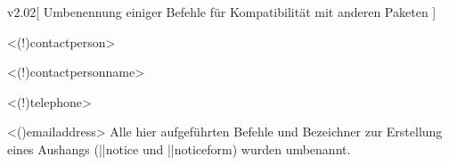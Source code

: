 \begin{Changes}{v2.02}[%
  Umbenennung einiger Befehle für Kompatibilität mit anderen Paketen%
]
\begin{Entity}{}
\begin{Obsolete}
  {}
  <\Macro(!){contactperson}>
\begin{Obsolete}
  {}
  <\Term(!){contactpersonname}>
\begin{Obsolete}
  {}
  <\Macro(!){telephone}>
\begin{Obsolete}
  {}
  <\Macro(){emailaddress}>
\printdeclarationlist
%
Alle hier aufgeführten Befehle und Bezeichner zur Erstellung eines Aushangs 
(\Environment||{notice} und \Macro||{noticeform}) wurden umbenannt.
\end{Obsolete}
\end{Obsolete}
\end{Obsolete}
\end{Obsolete}
\end{Entity}
\end{Changes}



